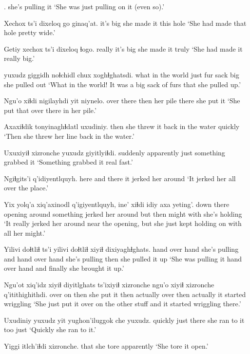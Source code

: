 \documentclass[12pt]{article}
\begin{document}
.
{{she's pulling it }}
\glt `She was just pulling on it (even so).'
\glend

\gll Xechox ts'i dixeloq go ginaq'at.
{it's big}  {} {she made it} this hole 
\glt `She had made that hole pretty wide.'
\glend

\gll Getiy xechox ts'i dixeloq ɬogo.
really {it's big} {} {she made it} truly
\glt `She had made it really big.'
\glend

 yuxudz      {giggidh noɬchidl} chux xoghɬghatsdi.
{{what in the world}} just {fur sack}         big  {she pulled out}
\glt `What in the world! It was a big sack of furs that she pulled up.'
\glend

\gll Ngu'o xiɬdi nigilayhdi yit niynelo.
{over there} then  {her pile} there {she put it}
\glt `She put that over there in her pile.'
\glend

\gll Axaxiɬdik tonyinaghɬdatl uxudiniy.
then    {she threw it back in the water}  quickly
\glt `Then she threw her line back in the water.'
\glend

\gll Uxuxiyiɬ xizronche yuxudz giyitlyiɬdi.
suddenly   apparently just  {something grabbed it}
\glt `Something grabbed it real fast.'
\glend

\gll Ngiɬgits'i q'idiyentlquyh.
{here and there} {it jerked her around}
\glt `It jerked her all over the place.'
\glend

\gll Yix yolq'a xiq'axinodl q'igiyentlquyh, ine' xiɬdi idiy axa yeting'.
{down there} opening around {something jerked her around} but then might with {she's holding}
\glt `It really jerked her around near the opening, but she just kept holding on with all her might.'
\glend

\gll  Yilivi doɬtliɬ ts'i yilivi doɬtliɬ xiyiɬ dixiyaghɬghats.
{hand over hand} {she's pulling} and {hand over hand} {she's pulling} then {she pulled it up}
\glt `She was pulling it hand over hand and finally she brought it up.'
\glend

\gll Ngu'ot xiq'idz xiyiɬ diyitlghats ts'ixiyiɬ xizronche ngu'o xiyiɬ xizronche q'itithighithdi.
over  on then  {she put it} then actually over then actually {it started wriggling}
\glt `She just put it over on the other stuff and it started wriggling there.'
\glend

\gll Uxudiniy yuxudz yit yughon'iluggok che yuxudz.
quickly  just   there {she ran to it} too just
\glt `Quickly she ran to it.'
\glend

\gll Yiggi itlch'iɬdi xizronche.
that {she tore} apparently
\glt `She tore it open.'
\glend
\end{document}
